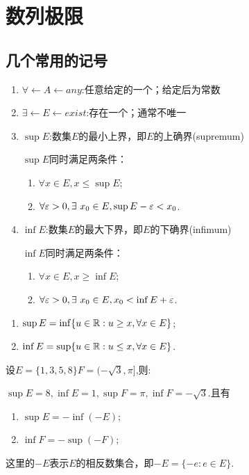 \chapter{数列极限}

\section{几个常用的记号}

\begin{enumerate}
    \item $\forall \leftarrow A \leftarrow any$:任意给定的一个；给定后为常数
    \item $\exists \leftarrow E \leftarrow exist$:存在一个；通常不唯一
    \item $\sup E$:数集$E$的最小上界，即$E$的上确界(supremum)

    $\sup E$同时满足两条件：
    \begin{enumerate}
        \item $\forall x\in E, x\leq \sup E$;
        \item $\forall \varepsilon >0, \exists \ x_0\in E, \sup E-\varepsilon<x_0$.
    \end{enumerate}
    \item $\inf E$:数集$E$的最大下界，即$E$的下确界(infimum)

    $\inf E$同时满足两条件：
    \begin{enumerate}
        \item $\forall x\in E, x\geq \inf E$;
        \item $\forall \varepsilon >0, \exists \ x_0\in E, x_0<\inf E+\varepsilon$.
    \end{enumerate}
\end{enumerate}

\begin{definition}
    \begin{enumerate}
        \item $\sup E = \inf \{ u \in \mathbb{R}: u \geq x, \forall x \in E \}$;
        \item $\inf E = \sup \{ u \in \mathbb{R}: u \leq x, \forall x \in E \}$.
    \end{enumerate}
\end{definition}


\begin{example*}
    设$E=\{1,3,5,8\} F= ( -\sqrt{3},\pi ]$,则:
    
    $\sup E=8, \inf E=1, \sup F=\pi, \inf F=-\sqrt{3}$.且有
    \begin{enumerate}
        \item $\sup E = -\inf(-E)$;
        \item $\inf F = -\sup(-F)$;
    \end{enumerate}

    \begin{remark}
        这里的$-E$表示$E$的相反数集合，即$-E=\{-e:e \in E\}$.
    \end{remark}
\end{example*}

